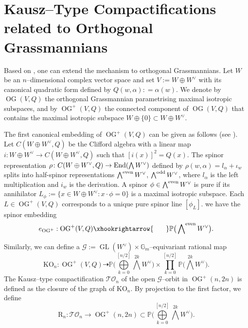 \documentclass[10pt]{amsart}
\theoremstyle{definition}
\newcommand{\OG}{\operatorname{OG}}
\newcommand{\TO}{\mathcal{TO}}
\newcommand{\GL}{\operatorname{GL}}
\newcommand{\Gm}{\mathbb{G}_m}
\newcommand{\KL}{\mathrm{KL}}
\newcommand{\KO}{\mathrm{KO}} %
\newcommand{\RL}{\mathrm{R}}
\newcommand{\RO}{\mathrm{R}} %
\theoremstyle{plain} %
\begin{document}
\section{Kausz--Type Compactifications related to Orthogonal Grassmannians}\label{og}

Based on \cite{FW,FMW}, one can extend the mechanism to orthogonal Grassmannians. Let $W$ be an $n$--dimensional complex vector space and set $V:=W\oplus W^\vee$ with its canonical quadratic form defined by $Q(w, \alpha): = \alpha(w)$.
We denote by $\OG(V,Q)$ the orthogonal Grassmannian parametrising maximal isotropic subspaces, and by $\OG^+(V,Q)$ the connected component of $\OG(V,Q)$ that contains the maximal isotropic subspace $W \oplus \{0\}\subset W\oplus W^\vee$.

The first canonical embedding of $\OG^+(V,Q)$ can be given as follows (see \cite{Knus}). Let $C(W\oplus W^\vee, Q)$ be the Clifford algebra with a linear map 
$i\colon W\oplus W^\vee\rightarrow C(W\oplus W^\vee, Q)$ such that $[i(x)]^2 = Q(x)$. The spinor representation $\rho\colon C(W\oplus W^\vee,Q)\rightarrow {\rm End}(\bigwedge W^\vee)$  defined by $\rho(w,\alpha)=l_{\alpha}+\iota_{w}$ splits into half-spinor representations $\bigwedge^{\rm even}W^\vee$, $\bigwedge^{\rm odd}W^\vee$, where 
$l_{\alpha}$ is the left multiplication
and $i_{w}$ is the derivation.
A spinor $\phi\in \bigwedge^{\rm even}W^\vee$ is pure if its annihilator $L_{\phi}:=\{x\in W\oplus W^\vee:x\cdot\phi=0\}$ is a maximal isotropic subspace. Each $L\in\OG^+(V,Q)$ corresponds to a unique pure spinor line 
$[\phi_L]$. we have the spinor embedding
\begin{equation}\label{eog}
e_{\OG^+}:\OG^+(V,Q)\xhookrightarrow{\,\,\,\,\,\,\,\,\,\,\,}\mathbb{P}\big(\bigwedge\nolimits^{\rm even}W^\vee\big).
\end{equation}

Similarly, we can define a $\mathscr{G} :=\GL(W^\vee)\times\Gm$--equivariant rational map
\begin{equation}\label{okl1}
\KO_n\colon\OG^+(V,Q)\dashrightarrow\mathbb P\big(\bigoplus\limits_{k=0}^{[n/2]}\bigwedge\limits^{2k}W^\vee\big)\times\prod\limits_{k=0}^{[n/2]}\mathbb P\big(\bigwedge\limits^{2k}W^\vee\big). 
\end{equation}
The Kausz--type compactification $\TO_n$ of the open $\mathscr{G}$--orbit in $\OG^+(n,2n)$ is defined as the closure of the graph of $\KO_n$.
By projection to the first factor, we define
\[
\RO_n \colon \TO_n \longrightarrow \OG^+(n,2n)\subset\mathbb P\big(\bigoplus\limits_{k=0}^{[n/2]}\bigwedge\limits^{2k}W^\vee\big).
\]
\end{document}
